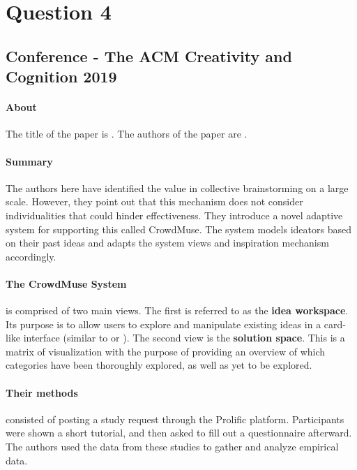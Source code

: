 \section{Question 4}

\subsection{Conference - The ACM Creativity and Cognition 2019}

\paragraph{About}
The title of the paper is . The authors of the paper are .

\paragraph{Summary}
The authors here have identified the value in collective brainstorming on a large scale. However, they point out that this mechanism does not consider individualities that could hinder effectiveness. They introduce a novel adaptive system for supporting this called CrowdMuse. The system models ideators based on their past ideas and adapts the system views and inspiration mechanism accordingly.

\paragraph{The CrowdMuse System} is comprised of two main views. The first is referred to as the \textbf{idea workspace}. Its purpose is to allow users to explore and manipulate existing ideas in a card-like interface (similar to  or ). The second view is the \textbf{solution space}. This is a matrix of visualization with the purpose of providing an overview of which categories have been thoroughly explored, as well as yet to be explored.

\paragraph{Their methods} consisted of posting a study request through the Prolific platform. Participants were shown a short tutorial, and then asked to fill out a questionnaire afterward. The authors used the data from these studies to gather and analyze empirical data.

